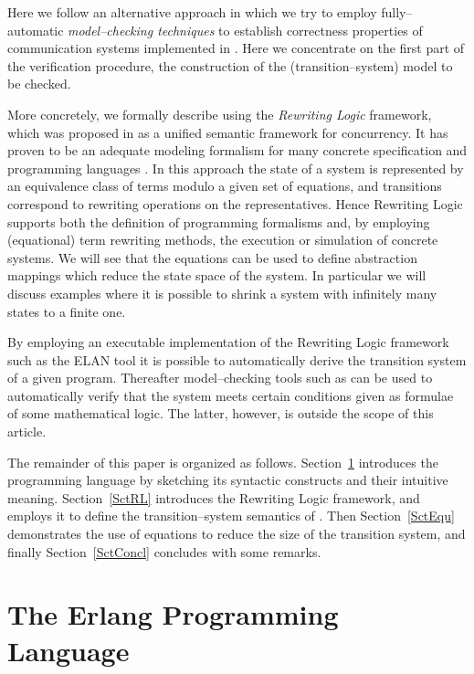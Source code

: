\documentclass{entcs}
\begin{document}
Here we follow an alternative approach in which we try to employ
fully--automatic \emph{model--checking techniques} to establish correctness
properties of communication systems implemented in \Erlang. Here we concentrate
on the first part of the verification procedure, the construction of the
(transition--system) model to be checked.

More concretely, we formally describe \Erlang using the \emph{Rewriting
Logic} framework, which was proposed in \cite{Mes92} as a unified
semantic framework for concurrency.  It has proven to be an adequate
modeling formalism for many concrete specification and programming
languages \cite{MM02}.  In this approach the state of a system is
represented by an equivalence class of terms modulo a given set of
equations, and transitions correspond to rewriting operations on the
representatives. Hence Rewriting Logic supports both the definition of
programming formalisms and, by employing (equational) term rewriting
methods, the execution or simulation of concrete systems. We will see that the
equations can be used to define abstraction mappings which reduce the state
space of the system. In particular we will discuss examples where it is
possible to shrink a system with infinitely many states to a finite one.

By employing an executable implementation of the Rewriting Logic framework such 
as the ELAN tool \cite{ELAN} it is possible to automatically derive the 
transition system of a given \Erlang program. Thereafter model--checking tools 
such as \Truth \cite{LLNT99} can be used to automatically verify that the 
system meets certain conditions given as formulae of some mathematical logic.
The latter, however, is outside the scope of this article.

The remainder of this paper is organized as follows.
Section~\ref{SctErlang} introduces the \Erlang programming language by
sketching its syntactic constructs and their intuitive
meaning. Section~\ref{SctRL} introduces the Rewriting Logic framework, and 
employs it to define the transition--system semantics of \Erlang. Then 
Section~\ref{SctEqu} demonstrates the use of equations to reduce the size of 
the transition system, and finally Section~\ref{SctConcl} concludes with some 
remarks.



\section{The Erlang Programming Language}
\label{SctErlang}
\end{document}
